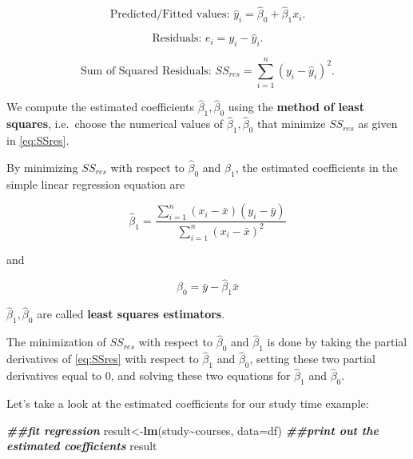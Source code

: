 \documentclass[
]{book}
\newenvironment{Shaded}{\begin{snugshade}}{\end{snugshade}}
\newcommand{\AttributeTok}[1]{\textcolor[rgb]{0.13,0.29,0.53}{#1}}
\newcommand{\DocumentationTok}[1]{\textcolor[rgb]{0.56,0.35,0.01}{\textbf{\textit{#1}}}}
\newcommand{\FunctionTok}[1]{\textcolor[rgb]{0.13,0.29,0.53}{\textbf{#1}}}
\newcommand{\NormalTok}[1]{#1}
\newcommand{\OtherTok}[1]{\textcolor[rgb]{0.56,0.35,0.01}{#1}}
\newcommand{\SpecialCharTok}[1]{\textcolor[rgb]{0.81,0.36,0.00}{\textbf{#1}}}
\begin{document}
\begin{equation}
\text{Predicted/Fitted values: } \hat{y}_i = \hat{\beta}_0+\hat{\beta}_1 x_i.
\label{eq:fits}
\end{equation}

\begin{equation} 
\text{Residuals: } e_i = y_i-\hat{y}_i.
\label{eq:res}
\end{equation}

\begin{equation} 
\text{Sum of Squared Residuals: } SS_{res} =  \sum\limits_{i=1}^n(y_i-\hat{y}_i)^2.
\label{eq:SSres}
\end{equation}

We compute the estimated coefficients \(\hat{\beta}_1,\hat{\beta}_0\) using the \textbf{method of least squares}, i.e.~choose the numerical values of \(\hat{\beta}_1,\hat{\beta}_0\) that minimize \(SS_{res}\) as given in \eqref{eq:SSres}.

By minimizing \(SS_{res}\) with respect to \(\hat{\beta}_0\) and \(\hat{\beta}_1\), the estimated coefficients in the simple linear regression equation are

\begin{equation} 
\hat{\beta}_1 = \frac{\sum\limits_{i=1}^n(x_i-\bar{x})(y_i-\bar{y})}{\sum\limits_{i=1}^n(x_i-\bar{x})^2}
\label{eq:b1}
\end{equation}

and

\begin{equation} 
\hat{\beta}_0 = \bar{y}- \hat{\beta}_1 \bar{x}
\label{eq:b0}
\end{equation}

\(\hat{\beta}_1, \hat{\beta}_0\) are called \textbf{least squares estimators}.

The minimization of \(SS_{res}\) with respect to \(\hat{\beta}_0\) and \(\hat{\beta}_1\) is done by taking the partial derivatives of \eqref{eq:SSres} with respect to \(\hat{\beta}_1\) and \(\hat{\beta}_0\), setting these two partial derivatives equal to 0, and solving these two equations for \(\hat{\beta}_1\) and \(\hat{\beta}_0\).

Let's take a look at the estimated coefficients for our study time example:

\begin{Shaded}
\begin{Highlighting}[]
\DocumentationTok{\#\#fit regression}
\NormalTok{result}\OtherTok{\textless{}{-}}\FunctionTok{lm}\NormalTok{(study}\SpecialCharTok{\textasciitilde{}}\NormalTok{courses, }\AttributeTok{data=}\NormalTok{df)}
\DocumentationTok{\#\#print out the estimated coefficients}
\NormalTok{result}
\end{Highlighting}
\end{Shaded}
\end{document}
